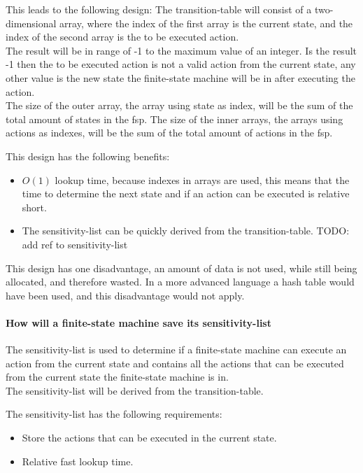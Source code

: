 This leads to the following design: The transition-table will consist of
a two-dimensional array, where the index of the first array is the
current state, and the index of the second array is the to be executed
action.\\
The result will be in range of -1 to the maximum value of an integer. Is
the result -1 then the to be executed action is not a valid action from
the current state, any other value is the new state the finite-state
machine will be in after executing the action.\\
The size of the outer array, the array using state as index, will be the
sum of the total amount of states in the fsp. The size of the inner
arrays, the arrays using actions as indexes, will be the sum of the
total amount of actions in the fsp.

This design has the following benefits:

\begin{itemize}
\tightlist
\item
  \(O (1)\) lookup time, because indexes in arrays are used, this means
  that the time to determine the next state and if an action can be
  executed is relative short.
\item
  The sensitivity-list can be quickly derived from the transition-table.
  TODO: add ref to sensitivity-list
\end{itemize}

This design has one disadvantage, an amount of data is not used, while
still being allocated, and therefore wasted. In a more advanced language
a hash table would have been used, and this disadvantage would not
apply.

\hypertarget{how-will-a-finite-state-machine-save-its-sensitivity-list}{%
\paragraph{How will a finite-state machine save its
sensitivity-list}\label{how-will-a-finite-state-machine-save-its-sensitivity-list}}

The sensitivity-list is used to determine if a finite-state machine can
execute an action from the current state and contains all the actions
that can be executed from the current state the finite-state machine is
in.\\
The sensitivity-list will be derived from the transition-table.

The sensitivity-list has the following requirements:

\begin{itemize}
\tightlist
\item
  Store the actions that can be executed in the current state.
\item
  Relative fast lookup time.
\end{itemize}

